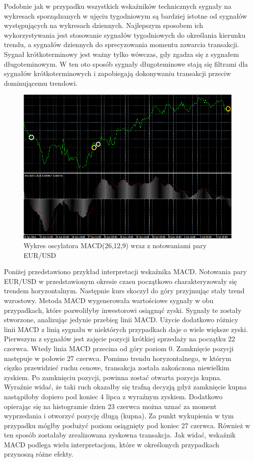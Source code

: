 \documentclass[pdflatex,11pt]{aghdpl}
\begin{document}
Podobnie jak w przypadku wszystkich wskaźników technicznych sygnały na wykresach sporządzanych w ujęciu tygodniowym są bardziej istotne od sygnałów występujących na wykresach dziennych. Najlepszym sposobem ich wykorzystywania jest stosowanie sygnałów tygodniowych do określania kierunku trendu, a sygnałów dziennych do sprecyzowania momentu zawarcia transakcji. Sygnał krótkoterminowy jest ważny tylko wówczas, gdy zgadza się z sygnałem długoteminowym. W ten oto sposób sygnały długoteminowe stają się filtrami dla sygnałów krótkoterminowych i zapobiegają dokonywaniu transakcji przeciw dominującemu trendowi\cite{5}.
\begin{figure}[ht]
\begin{center}
\includegraphics[width=15cm]{macd.png}
\caption{Wykres oscylatora MACD(26,12,9) wraz z notowaniami pary EUR/USD}
\label{macd}
\end{center}
\end{figure}

Poniżej przedstawiono przykład interpretacji wskaźnika MACD. Notowania pary EUR/USD w przedstawionym okresie czasu początkowo charakteryzowały się trendem horyzontalnym. Następnie kurs skoczył do góry przyjmując stały trend wzrostowy. Metoda MACD wygenerowała wartościowe sygnały w obu przypadkach, które pozwoliłyby inwestorowi osiągnąć zyski. Sygnały te zostały stworzone, analizując jedynie przebieg linii MACD. Użycie dodatkowo różnicy linii MACD z linią sygnału w niektórych przypadkach daje o wiele większe zyski. Pierwszym z sygnałów jest zajęcie pozycji krótkiej sprzedaży na początku 22 czerwca. Wtedy linia MACD przecina od góry poziom 0. Zamknięcie pozycji następuje w połowie 27 czerwca. Pomimo trendu horyzontalnego, w którym cięzko przewidzieć ruchu cenowe, transakcja została zakończona niewielkim zyskiem. Po zamknięciu pozycji, powinna zostać otwarta pozycja kupna. Wyraźnie widać, że taki ruch okazałby się trafną decyzją gdyż zamknięcie kupna nastąpiłoby dopiero pod koniec 4 lipca z wyraźnym zyskiem. Dodatkowo opierając się na histogramie dzien 23 czerwca można uznać za moment wyprzedania i otworzyć pozycję długą (kupna). Za punkt wykupienia w tym przypadku mógłby posłużyć poziom osiągnięty pod koniec 27 czerwca. Również w ten sposób zostałaby zrealizowana zyskowna transakcja. Jak widać, wskaźnik MACD podlega wielu interpretacjom, które w określonych przypadkach przynoszą różne efekty. 
\end{document}
